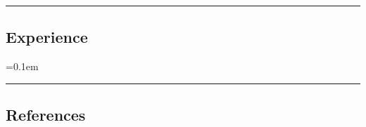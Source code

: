 \hrule
\vspace{-0.4em}
\subsection*{Experience}

\begin{itemize}
  \parskip=0.1em

  
  
  
  
\end{itemize}

\hrule
\vspace{-0.4em}
\subsection*{References}
\begin{itemize}
  
\end{itemize}


